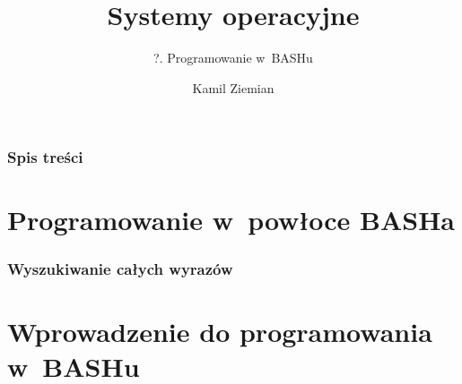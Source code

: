 \documentclass[10pt,t]{beamer}
\title{Systemy operacyjne}
\subtitle{?. Programowanie w~BASHu}
\author{Kamil Ziemian \\
  \email}
\begin{document}





\RaggedRight





\maketitle










\begin{frame}
  \frametitle{Spis treści}


  \tableofcontents

\end{frame}










\section{Programowanie w~powłoce BASHa}


\begin{frame}
  \frametitle{Wyszukiwanie całych wyrazów}




\end{frame}










\section{Wprowadzenie do programowania w~BASHu}
\end{document}
